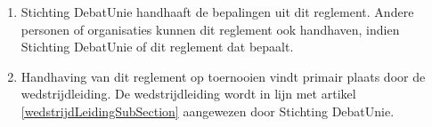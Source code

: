 
\begin{enumerate}
\item Stichting DebatUnie handhaaft de bepalingen uit dit reglement. Andere personen of organisaties kunnen dit reglement ook handhaven, indien Stichting DebatUnie of dit reglement dat bepaalt.
\item Handhaving van dit reglement op toernooien vindt primair plaats door de wedstrijdleiding. De wedstrijdleiding wordt in lijn met artikel \ref{wedstrijdLeidingSubSection} aangewezen door Stichting DebatUnie.
\end{enumerate}